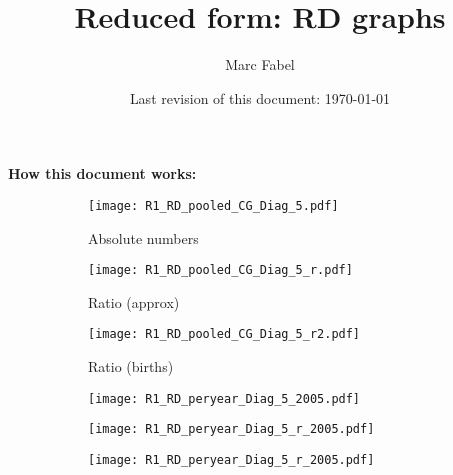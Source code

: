 \documentclass[a4paper ]{article}
\author{Marc Fabel}
\title{Reduced form: RD graphs}
\date{Last revision of this document: \today}
\begin{document}
\maketitle

\textbf{How this document works: }

\begin{figure}[h]
\centering
\caption{Pooled}
\begin{subfigure}[t]{0.31\textwidth}
		\centering
		\caption{Absolute numbers}
		\texttt{[image: R1\_RD\_pooled\_CG\_Diag\_5.pdf]}	
\end{subfigure}
\begin{subfigure}[t]{0.31\textwidth}
		\centering
		\caption{Ratio (approx)}
		\texttt{[image: R1\_RD\_pooled\_CG\_Diag\_5\_r.pdf]}	
\end{subfigure}
\begin{subfigure}[t]{0.31\textwidth}
		\centering
		\caption{Ratio (births)}
		\texttt{[image: R1\_RD\_pooled\_CG\_Diag\_5\_r2.pdf]}	
\end{subfigure}
\begin{subfigure}[t]{0.31\textwidth}
		\centering
		\texttt{[image: R1\_RD\_peryear\_Diag\_5\_2005.pdf]}	
\end{subfigure}
\begin{subfigure}[t]{0.31\textwidth}
		\centering
		\texttt{[image: R1\_RD\_peryear\_Diag\_5\_r\_2005.pdf]}	
\end{subfigure}
\begin{subfigure}[t]{0.31\textwidth}
		\centering
		\texttt{[image: R1\_RD\_peryear\_Diag\_5\_r\_2005.pdf]}	
\end{subfigure}
\end{figure}
\end{document}

